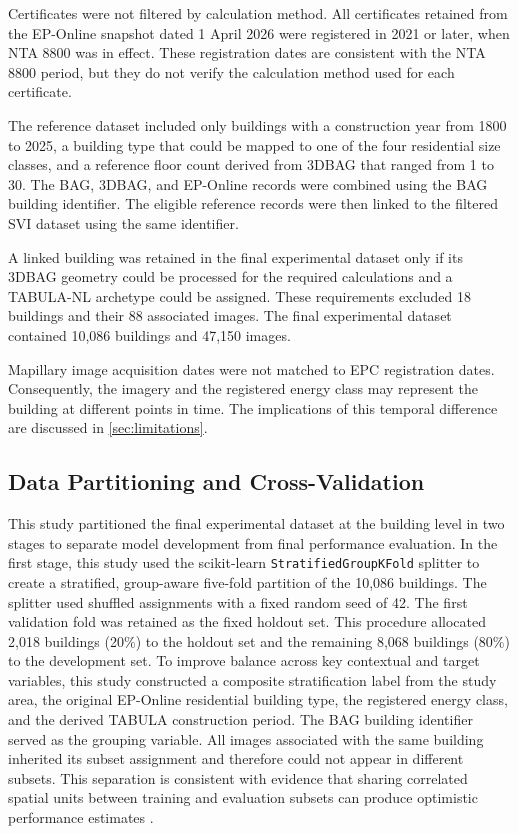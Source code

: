 Certificates were not filtered by calculation method.
All certificates retained from the EP-Online snapshot dated 1 April 2026 were registered in 2021 or later, when NTA 8800 \parencite{NTA8800} was in effect.
These registration dates are consistent with the NTA 8800 period, but they do not verify the calculation method used for each certificate.

The reference dataset included only buildings with a construction year from 1800 to 2025, a building type that could be mapped to one of the four residential size classes, and a reference floor count derived from 3DBAG that ranged from 1 to 30.
The BAG, 3DBAG, and EP-Online records were combined using the BAG building identifier.
The eligible reference records were then linked to the filtered \ac{SVI} dataset using the same identifier.

A linked building was retained in the final experimental dataset only if its 3DBAG geometry could be processed for the required calculations and a TABULA-NL archetype could be assigned.
These requirements excluded 18 buildings and their 88 associated images.
The final experimental dataset contained 10,086 buildings and 47,150 images.

Mapillary image acquisition dates were not matched to EPC registration dates.
Consequently, the imagery and the registered energy class may represent the building at different points in time.
The implications of this temporal difference are discussed in \cref{sec:limitations}.

\subsection{Data Partitioning and Cross-Validation}
\label{sec:data_partitioning}

This study partitioned the final experimental dataset at the building level in two stages to separate model development from final performance evaluation.
In the first stage, this study used the scikit-learn \texttt{StratifiedGroupKFold} splitter to create a stratified, group-aware five-fold partition of the 10,086 buildings.
The splitter used shuffled assignments with a fixed random seed of 42.
The first validation fold was retained as the fixed holdout set.
This procedure allocated 2,018 buildings (20\%) to the holdout set and the remaining 8,068 buildings (80\%) to the development set.
To improve balance across key contextual and target variables, this study constructed a composite stratification label from the study area, the original EP-Online residential building type, the registered energy class, and the derived TABULA construction period.
The BAG building identifier served as the grouping variable.
All images associated with the same building inherited its subset assignment and therefore could not appear in different subsets.
This separation is consistent with evidence that sharing correlated spatial units between training and evaluation subsets can produce optimistic performance estimates \parencite{garbasevschi2021}.

